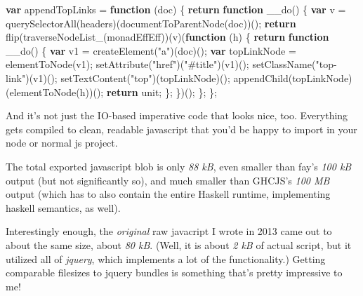 \documentclass[]{article}
\newenvironment{Shaded}{}{}
\newcommand{\KeywordTok}[1]{\textcolor[rgb]{0.00,0.44,0.13}{\textbf{{#1}}}}
\newcommand{\StringTok}[1]{\textcolor[rgb]{0.25,0.44,0.63}{{#1}}}
\newcommand{\ControlFlowTok}[1]{\textcolor[rgb]{0.00,0.44,0.13}{\textbf{{#1}}}}
\newcommand{\OperatorTok}[1]{\textcolor[rgb]{0.40,0.40,0.40}{{#1}}}
\newcommand{\AttributeTok}[1]{\textcolor[rgb]{0.49,0.56,0.16}{{#1}}}
\newcommand{\NormalTok}[1]{{#1}}
\begin{document}
\begin{Shaded}
\begin{Highlighting}[]
\KeywordTok{var} \NormalTok{appendTopLinks }\OperatorTok{=} \KeywordTok{function} \NormalTok{(doc) }\OperatorTok{\{}
    \ControlFlowTok{return} \KeywordTok{function} \AttributeTok{__do}\NormalTok{() }\OperatorTok{\{}
        \KeywordTok{var} \NormalTok{v }\OperatorTok{=} \AttributeTok{querySelectorAll}\NormalTok{(headers)(}\AttributeTok{documentToParentNode}\NormalTok{(doc))()}\OperatorTok{;}
        \ControlFlowTok{return} \AttributeTok{flip}\NormalTok{(}\AttributeTok{traverseNodeList_}\NormalTok{(monadEffEff))(v)(}\KeywordTok{function} \NormalTok{(h) }\OperatorTok{\{}
            \ControlFlowTok{return} \KeywordTok{function} \AttributeTok{__do}\NormalTok{() }\OperatorTok{\{}
                \KeywordTok{var} \NormalTok{v1 }\OperatorTok{=} \AttributeTok{createElement}\NormalTok{(}\StringTok{"a"}\NormalTok{)(doc)()}\OperatorTok{;}
                \KeywordTok{var} \NormalTok{topLinkNode }\OperatorTok{=} \AttributeTok{elementToNode}\NormalTok{(v1)}\OperatorTok{;}
                \AttributeTok{setAttribute}\NormalTok{(}\StringTok{"href"}\NormalTok{)(}\StringTok{"#title"}\NormalTok{)(v1)()}\OperatorTok{;}
                \AttributeTok{setClassName}\NormalTok{(}\StringTok{"top-link"}\NormalTok{)(v1)()}\OperatorTok{;}
                \AttributeTok{setTextContent}\NormalTok{(}\StringTok{"top"}\NormalTok{)(topLinkNode)()}\OperatorTok{;}
                \AttributeTok{appendChild}\NormalTok{(topLinkNode)(}\AttributeTok{elementToNode}\NormalTok{(h))()}\OperatorTok{;}
                \ControlFlowTok{return} \NormalTok{unit}\OperatorTok{;}
            \OperatorTok{\};}
        \OperatorTok{\}}\NormalTok{)()}\OperatorTok{;}
    \OperatorTok{\};}
\OperatorTok{\};}
\end{Highlighting}
\end{Shaded}

And it's not just the IO-based imperative code that looks nice, too.
Everything gets compiled to clean, readable javascript that you'd be
happy to import in your node or normal js project.

The total exported javascript blob is only \emph{88 kB}, even smaller
than fay's \emph{100 kB} output (but not significantly so), and much
smaller than GHCJS's \emph{100 MB} output (which has to also contain the
entire Haskell runtime, implementing haskell semantics, as well).

Interestingly enough, the \emph{original} raw javacript I wrote in 2013
came out to about the same size, about \emph{80 kB}. (Well, it is about
\emph{2 kB} of actual script, but it utilized all of \emph{jquery},
which implements a lot of the functionality.) Getting comparable
filesizes to jquery bundles is something that's pretty impressive to me!
\end{document}
